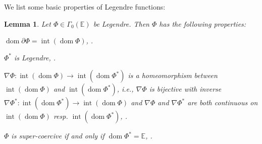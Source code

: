 \documentclass[11pt,onecolumn]{article}
\DeclareMathOperator{\dom}{dom}
\DeclareMathOperator{\intr}{int}
\newtheorem{lemma}[lemma]{Lemma}
\theoremstyle{remark}
\begin{document}
We list some basic properties of Legendre functions:
\begin{lemma} \label{thm:legendre_props}
Let $\Phi \in \Gamma_0(\mathbb{E})$ be Legendre. Then $\Phi$ has the following properties:
\begin{lemenum}
\item $\dom \partial \Phi = \intr (\dom\Phi)$, {\normalfont\rmfamily\cite[Theorem 26.1]{Roc70}}. \label{thm:legendre_props:dom_grad_dom_phi}
\item $\Phi^*$ is Legendre, {\normalfont\rmfamily\cite[Theorem 26.3]{Roc70}}. \label{thm:legendre_props:conjugate_legendre}
\item $\nabla \Phi :\intr (\dom\Phi) \to \intr (\dom\Phi^*)$ is a homeomorphism between $\intr (\dom\Phi)$ and $\intr (\dom\Phi^*)$, i.e., $\nabla \Phi$ is bijective with inverse $\nabla \Phi^*:\intr (\dom\Phi^*) \to \intr (\dom\Phi)$ and $\nabla \Phi$ and $\nabla \Phi^*$ are both continuous on $\intr (\dom\Phi)$ resp. $ \intr(\dom\Phi^*)$, {\normalfont\rmfamily\cite[Theorem 26.5]{Roc70}}. \label{thm:legendre_props:homeomorphism}
\item $\Phi$ is \emph{super-coercive} if and only if $\dom \Phi^*= \mathbb{E}$, {\normalfont\rmfamily\cite[Proposition 2.16]{bauschke1997legendre}}. \label{thm:legendre_props:super_coercive}
\end{lemenum}
\end{lemma}
\end{document}
